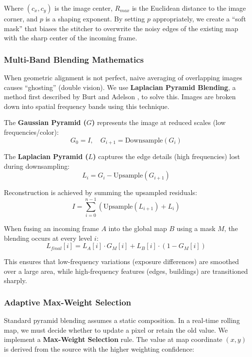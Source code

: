 \documentclass[conference]{IEEEtran}
\begin{document}
\noindent Where $(c_x, c_y)$ is the image center, $R_{max}$ is the Euclidean distance to the image corner, and $p$ is a shaping exponent. By setting $p$ appropriately, we create a ``soft mask'' that biases the stitcher to overwrite the noisy edges of the existing map with the sharp center of the incoming frame.

\subsubsection{Multi-Band Blending Mathematics}
When geometric alignment is not perfect, naive averaging of overlapping images causes ``ghosting'' (double vision). We use \textbf{Laplacian Pyramid Blending}, a method first described by Burt and Adelson \cite{burt1983laplacian}, to solve this. Images are broken down into spatial frequency bands using this technique.

The \textbf{Gaussian Pyramid ($G$)} represents the image at reduced scales (low frequencies/color):
\begin{equation}
G_0 = I, \quad G_{i+1} = \text{Downsample}(G_i)
\end{equation}

The \textbf{Laplacian Pyramid ($L$)} captures the edge details (high frequencies) lost during downsampling:
\begin{equation}
L_i = G_i - \text{Upsample}(G_{i+1})
\end{equation}

Reconstruction is achieved by summing the upsampled residuals:
\begin{equation}
I = \sum_{i=0}^{n-1} \left( \text{Upsample}(L_{i+1}) + L_i \right)
\end{equation}

When fusing an incoming frame $A$ into the global map $B$ using a mask $M$, the blending occurs at every level $i$:
\begin{equation}
L_{final}[i] = L_A[i] \cdot G_M[i] + L_B[i] \cdot (1 - G_M[i])
\end{equation}

This ensures that low-frequency variations (exposure differences) are smoothed over a large area, while high-frequency features (edges, buildings) are transitioned sharply.

\subsubsection{Adaptive Max-Weight Selection}
Standard pyramid blending assumes a static composition. In a real-time rolling map, we must decide whether to update a pixel or retain the old value. We implement a \textbf{Max-Weight Selection} rule. The value at map coordinate $(x, y)$ is derived from the source with the higher weighting confidence:
\end{document}
